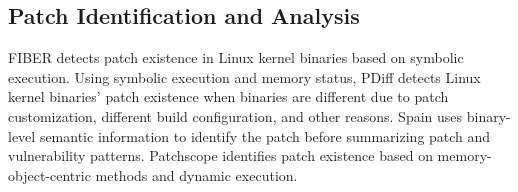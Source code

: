 




\subsection{Patch Identification and Analysis}
FIBER \cite{fiber} detects patch existence in Linux kernel binaries based on symbolic execution. 
Using symbolic execution and memory status, PDiff \cite{pdiff} detects Linux kernel binaries' patch existence when binaries are different due to patch customization, different build configuration, and other reasons.
Spain \cite{spain} uses binary-level semantic information to identify the patch before summarizing patch and vulnerability patterns. 
Patchscope \cite{patchscope} identifies patch existence based on memory-object-centric methods and dynamic execution.



